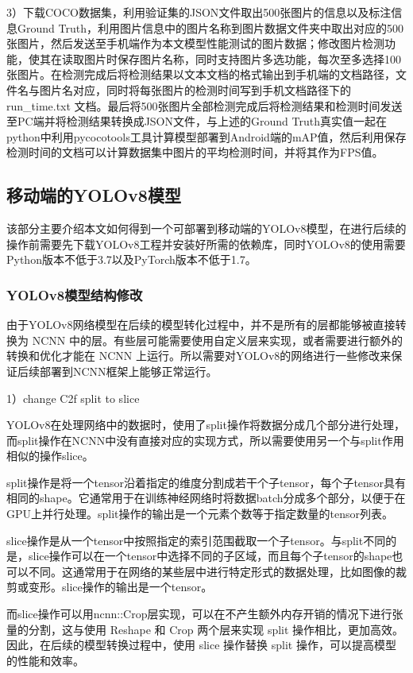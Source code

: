 \documentclass{ctexart}
\numberwithin{equation}{section}%
\numberwithin{figure}{section}%
\numberwithin{table}{section}%
\begin{document}
	3）下载COCO数据集，利用验证集的JSON文件取出500张图片的信息以及标注信息Ground Truth，利用图片信息中的图片名称到图片数据文件夹中取出对应的500张图片，然后发送至手机端作为本文模型性能测试的图片数据；修改图片检测功能，使其在读取图片时保存图片名称，同时支持图片多选功能，每次至多选择100张图片。在检测完成后将检测结果以文本文档的格式输出到手机端的文档路径，文件名与图片名对应，同时将每张图片的检测时间写到手机文档路径下的run\_time.txt
	文档。最后将500张图片全部检测完成后将检测结果和检测时间发送至PC端并将检测结果转换成JSON文件，与上述的Ground Truth真实值一起在python中利用pycocotools工具计算模型部署到Android端的mAP值，然后利用保存检测时间的文档可以计算数据集中图片的平均检测时间，并将其作为FPS值。
	
	\subsection{移动端的YOLOv8模型}
	该部分主要介绍本文如何得到一个可部署到移动端的YOLOv8模型，在进行后续的操作前需要先下载YOLOv8工程并安装好所需的依赖库，同时YOLOv8的使用需要Python版本不低于3.7以及PyTorch版本不低于1.7。
	
	\subsubsection{YOLOv8模型结构修改}
	由于YOLOv8网络模型在后续的模型转化过程中，并不是所有的层都能够被直接转换为 NCNN 中的层。有些层可能需要使用自定义层来实现，或者需要进行额外的转换和优化才能在 NCNN 上运行。所以需要对YOLOv8的网络进行一些修改来保证后续部署到NCNN框架上能够正常运行。
	
	1）change C2f split to slice
	
	YOLOv8在处理网络中的数据时，使用了split操作将数据分成几个部分进行处理，而split操作在NCNN中没有直接对应的实现方式，所以需要使用另一个与split作用相似的操作slice。
	
	split操作是将一个tensor沿着指定的维度分割成若干个子tensor，每个子tensor具有相同的shape。它通常用于在训练神经网络时将数据batch分成多个部分，以便于在GPU上并行处理。split操作的输出是一个元素个数等于指定数量的tensor列表。
	
	slice操作是从一个tensor中按照指定的索引范围截取一个子tensor。与split不同的是，slice操作可以在一个tensor中选择不同的子区域，而且每个子tensor的shape也可以不同。这通常用于在网络的某些层中进行特定形式的数据处理，比如图像的裁剪或变形。slice操作的输出是一个tensor。
	
	而slice操作可以用ncnn::Crop层实现，可以在不产生额外内存开销的情况下进行张量的分割，这与使用 Reshape 和 Crop 两个层来实现 split 操作相比，更加高效。因此，在后续的模型转换过程中，使用 slice 操作替换 split 操作，可以提高模型的性能和效率。
	
\end{document}
